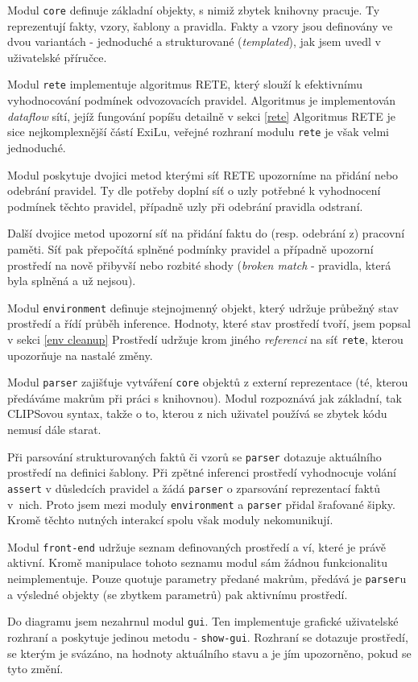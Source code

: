 Modul \verb|core| definuje základní objekty, s nimiž zbytek knihovny
pracuje. Ty reprezentují fakty, vzory, šablony a pravidla. Fakty a vzory jsou
definovány ve dvou variantách - jednoduché a strukturované (\emph{templated}),
jak jsem uvedl v uživatelské příručce.

Modul \verb|rete| implementuje algoritmus RETE, který slouží k efektivnímu
vyhodnocování podmínek odvozovacích pravidel. Algoritmus je implementován
\emph{dataflow} sítí, jejíž fungování popíšu detailně v sekci \ref{rete}
Algoritmus RETE je sice nejkomplexnější částí ExiLu, veřejné rozhraní modulu
\verb|rete| je však velmi jednoduché.

Modul poskytuje dvojici metod kterými síť RETE upozorníme na přidání nebo
odebrání pravidel. Ty dle potřeby doplní síť o uzly potřebné k vyhodnocení
podmínek těchto pravidel, případně uzly při odebrání pravidla odstraní.

Další dvojice metod upozorní síť na přidání faktu do (resp. odebrání z) pracovní
paměti. Síť pak přepočítá splněné podmínky pravidel a případně upozorní
prostředí na nově přibyvší nebo rozbité shody (\emph{broken match} - pravidla,
která byla splněná a už nejsou).

Modul \verb|environment| definuje stejnojmenný objekt, který udržuje průbežný
stav prostředí a řídí průběh inference. Hodnoty, které stav prostředí tvoří,
jsem popsal v sekci \ref{env cleanup} Prostředí udržuje krom jiného
\emph{referenci} na síť \verb|rete|, kterou upozorňuje na nastalé změny.

Modul \verb|parser| zajišťuje vytváření \verb|core| objektů z externí
reprezentace (té, kterou předáváme makrům při práci s knihovnou). Modul
rozpoznává jak základní, tak CLIPSovou syntax, takže o to, kterou z nich
uživatel používá se zbytek kódu nemusí dále starat.

Při parsování strukturovaných faktů či vzorů se \verb|parser| dotazuje
aktuálního prostředí na definici šablony. Při zpětné inferenci prostředí
vyhodnocuje volání \verb|assert| v důsledcích pravidel a žádá \verb|parser| o
zparsování reprezentací faktů v~nich. Proto jsem mezi moduly \verb|environment|
a \verb|parser| přidal šrafované šipky. Kromě těchto nutných interakcí spolu
však moduly nekomunikují.

Modul \verb|front-end| udržuje seznam definovaných prostředí a ví, které je
právě aktivní. Kromě manipulace tohoto seznamu modul sám žádnou funkcionalitu
neimplementuje. Pouze quotuje parametry předané makrům, předává je
\verb|parser|u a výsledné objekty (se zbytkem parametrů) pak aktivnímu prostředí.

Do diagramu jsem nezahrnul modul \verb|gui|. Ten implementuje grafické
uživatelské rozhraní a poskytuje jedinou metodu - \verb|show-gui|. Rozhraní se
dotazuje prostředí, se kterým je svázáno, na hodnoty aktuálního stavu a je jím
upozorněno, pokud se tyto změní.
